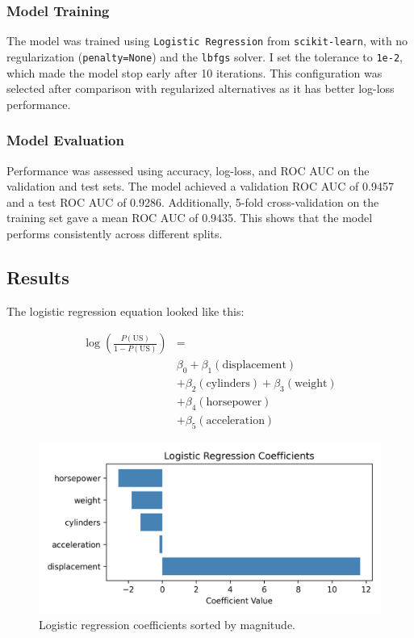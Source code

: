 \documentclass[a4paper, twocolumn]{article}
\begin{document}
\subsubsection{Model Training}
The model was trained using \texttt{Logistic Regression} from \texttt{scikit-learn}, with no regularization (\texttt{penalty=None}) and the \texttt{lbfgs} solver. I set the tolerance to \texttt{1e-2}, which made the model stop early after 10 iterations. This configuration was selected after comparison with regularized alternatives as it has better log-loss performance.

\subsubsection{Model Evaluation}
Performance was assessed using accuracy, log-loss, and ROC AUC on the validation and test sets. The model achieved a validation ROC AUC of 0.9457 and a test ROC AUC of 0.9286. Additionally, 5-fold cross-validation on the training set gave a mean ROC AUC of 0.9435. This shows that the model performs consistently across different splits.

\subsection{Results}
The logistic regression equation looked like this:

\begin{align*}
\log\left(\frac{P(\text{US})}{1 - P(\text{US})}\right) 
&= \\
& \beta_0 + \beta_1(\text{displacement}) \\
&+ \beta_2(\text{cylinders}) + \beta_3(\text{weight}) \\
&+ \beta_4(\text{horsepower}) \\
&+ \beta_5(\text{acceleration})
\end{align*}

\begin{figure}[h]
\centering
\includegraphics[width=\linewidth]{logistic_coefficients.png}
\caption{Logistic regression coefficients sorted by magnitude.}
\end{figure}
\end{document}
